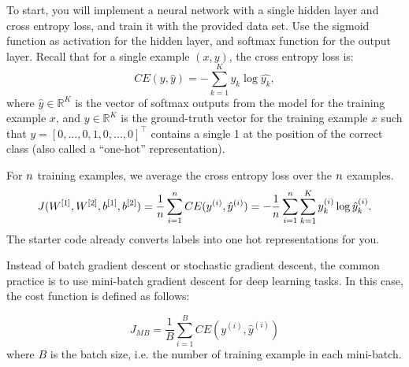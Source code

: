 To start, you will implement a neural network with a single hidden layer
and cross entropy loss, and train it with the provided data set. Use the
sigmoid function as activation for the hidden layer, and softmax function
for the output layer. Recall that for a single example $(x, y)$, the cross
entropy loss is:
$$CE(y, \hat{y}) = - \sum_{k=1}^K y_k \log \hat{y_k},$$
where $\hat{y} \in \mathbb{R}^{K}$ is the vector of softmax outputs
from the model for the training example $x$,
and $y \in \mathbb{R}^{K}$ is the ground-truth vector for the training example
$x$ such that $y = [0,...,0,1,0,...,0]^\top$ contains a single 1 at the
position of the correct class (also called a ``one-hot'' representation).

For ${n}$ training examples, we average the cross entropy loss over the ${n}$ examples.
  \begin{equation*}
  J(W^{[1]},W^{[2]},b^{[1]},b^{[2]}) = \frac{1}{{n}}\sum_{i=1}^{n} CE(y^{(i)}, \hat{y}^{(i)}) = - \frac{1}{{n}}\sum_{i=1}^{n} \sum_{k=1}^K y_k^{(i)} \log \hat{y}_k^{(i)}.
  \end{equation*}
The starter code already converts labels into one hot representations for you.

Instead of batch gradient descent or stochastic gradient descent, the common practice
is to use mini-batch gradient descent for deep learning tasks. In this case, the
cost function is defined as follows:

  \begin{equation*}
  J_{MB} = \frac{1}{B}\sum_{i=1}^{B}CE(y^{(i)}, \hat{y}^{(i)})
  \end{equation*}
where $B$ is the batch size, i.e. the number of training example in each mini-batch. 

\begin{enumerate}
  

  

  
 \end{enumerate}


